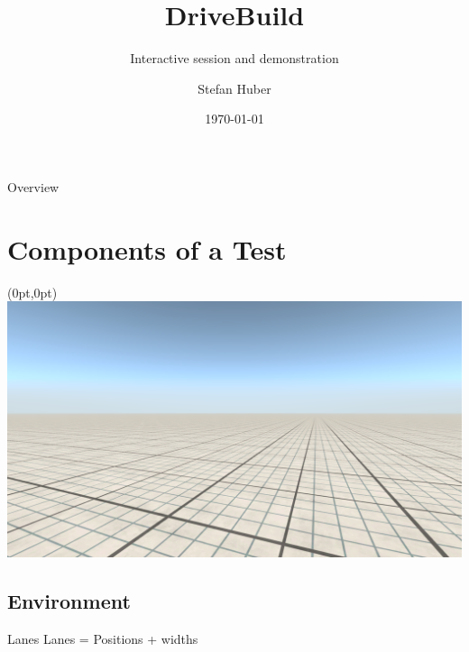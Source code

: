 \documentclass[aspectratio=169]{beamer}
\title{DriveBuild}
\subtitle{Interactive session and demonstration}
\author{Stefan Huber}
\institute{University of Passau}
\date{\today}
\begin{document}
\maketitle%

\begin{frame}{Overview}
    \tableofcontents%
\end{frame}

\section{Components of a Test}
\begin{frame}[plain]
    \begin{textblock*}{\paperwidth} (0pt,0pt)
        \includegraphics[width=\paperwidth]{media/smallGridPlain.png}
    \end{textblock*}
\end{frame}
\subsection{Environment}
\begin{frame}{Lanes}
    \centering
    Lanes = Positions + widths
\end{frame}
\end{document}
